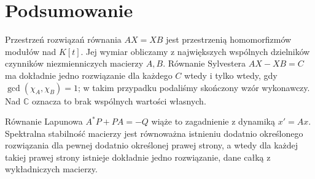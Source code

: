 \section{Podsumowanie}
\label{sec:lin22-summary}

Przestrzeń rozwiązań równania
\(AX=XB\) jest przestrzenią
homomorfizmów modułów
nad \(K[t]\). Jej wymiar
obliczamy z największych
wspólnych dzielników
czynników niezmienniczych
macierzy \(A,B\).
Równanie Sylvestera
\(AX-XB=C\)
ma dokładnie jedno rozwiązanie
dla każdego \(C\) wtedy
i tylko wtedy, gdy
\(\gcd(\chi_A,\chi_B)=1\);
w takim przypadku podaliśmy
skończony wzór wykonawczy.
Nad \(\mathbb C\) oznacza to
brak wspólnych wartości własnych.

Równanie Lapunowa
\(A^*P+PA=-Q\)
wiąże to zagadnienie
z dynamiką \(x'=Ax\).
Spektralna stabilność macierzy
jest równoważna istnieniu
dodatnio określonego rozwiązania
dla pewnej dodatnio określonej
prawej strony, a wtedy dla
każdej takiej prawej strony
istnieje dokładnie jedno rozwiązanie,
dane całką z wykładniczych macierzy.
